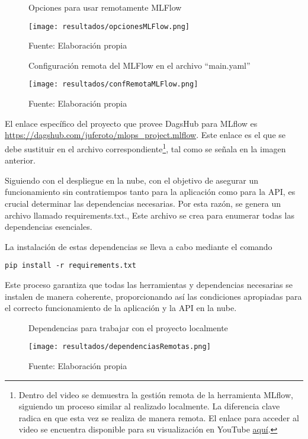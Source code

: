 \newpage

\begin{figure}[h]
	\centering
	\caption{Opciones para usar remotamente MLFlow}
	\texttt{[image: resultados/opcionesMLFlow.png]}
	\caption*{\footnotesize Fuente: Elaboración propia}
	\label{fig:figuraOpcionesMLFlow}
\end{figure}

\begin{figure}[h]
\centering
\caption{Configuración remota del MLFlow en el archivo ``main.yaml''}
\texttt{[image: resultados/confRemotaMLFlow.png]}
\caption*{\footnotesize Fuente: Elaboración propia}
\label{fig:figuraConfRemotaMLFlow}
\end{figure}

El enlace específico del proyecto que provee DagsHub para MLflow es \\ \href{https://dagshub.com/juferoto/mlops_project.mlflow}{https://dagshub.com/juferoto/mlops\_project.mlflow}. Este enlace es el que se debe sustituir en el archivo correspondiente\footnote{Dentro del video se demuestra la gestión remota de la herramienta MLflow, siguiendo un proceso similar al realizado localmente. La diferencia clave radica en que esta vez se realiza de manera remota. El enlace para acceder al video se encuentra disponible para su visualización en YouTube \href{https://youtu.be/U2DqNOixHWw?si=OrJcIFpGiqfodAQy}{aquí}.}, tal como se señala en la imagen anterior.

Siguiendo con el despliegue en la nube, con el objetivo de asegurar un funcionamiento sin contratiempos tanto para la aplicación como para la API, es crucial determinar las dependencias necesarias. Por esta razón, se genera un archivo llamado requirements.txt., Este archivo se crea para enumerar todas las dependencias esenciales. 

\newpage

La instalación de estas dependencias se lleva a cabo mediante el comando 
\begin{verbatim}
pip install -r requirements.txt
\end{verbatim} 

Este proceso garantiza que todas las herramientas y dependencias necesarias se instalen de manera coherente, proporcionando así las condiciones apropiadas para el correcto funcionamiento de la aplicación y la API en la nube.

\begin{figure}[h]
	\centering
	\caption{Dependencias para trabajar con el proyecto localmente}
	\texttt{[image: resultados/dependenciasRemotas.png]}
	\caption*{\footnotesize Fuente: Elaboración propia}
	\label{fig:figuraDependenciasRemotas}
\end{figure}

